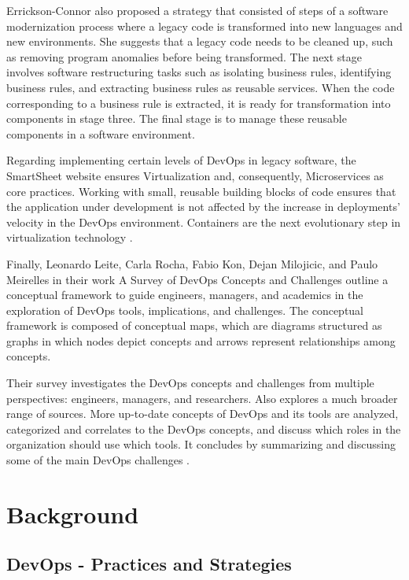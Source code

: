 Errickson-Connor \cite{errickson2003} also proposed a strategy that consisted of
steps of a software modernization process where a legacy code is transformed
into new languages and new environments. She suggests that a legacy code needs
to be cleaned up, such as removing program anomalies before being transformed.
The next stage involves software restructuring tasks such as isolating business
rules, identifying business rules, and extracting business rules as reusable
services. When the code corresponding to a business rule is extracted, it is
ready for transformation into components in stage three. The final stage is to
manage these reusable components in a software environment.

Regarding implementing certain levels of DevOps in legacy software, the
SmartSheet website ensures Virtualization and, consequently, Microservices as
core practices. Working with small, reusable building blocks of code ensures
that the application under development is not affected by the increase in
deployments' velocity in the DevOps environment. Containers are the next
evolutionary step in virtualization technology \cite{smartsheet2020}.

Finally, Leonardo Leite, Carla Rocha, Fabio Kon, Dejan Milojicic, and Paulo
Meirelles in their work A Survey of DevOps Concepts and Challenges outline a
conceptual framework to guide engineers, managers, and academics in the
exploration of DevOps tools, implications, and challenges. The conceptual
framework is composed of conceptual maps, which are diagrams structured as
graphs in which nodes depict concepts and arrows represent relationships among
concepts\cite{rocha2019}.

Their survey investigates the DevOps concepts and challenges from multiple
perspectives: engineers, managers, and researchers. Also explores a much broader
range of sources. More up-to-date concepts of DevOps and its tools are analyzed,
categorized and correlates to the DevOps concepts, and discuss which roles in
the organization should use which tools. It concludes by summarizing and
discussing some of the main DevOps challenges \cite{rocha2019}.

\section{Background}

\subsection{DevOps - Practices and Strategies}

